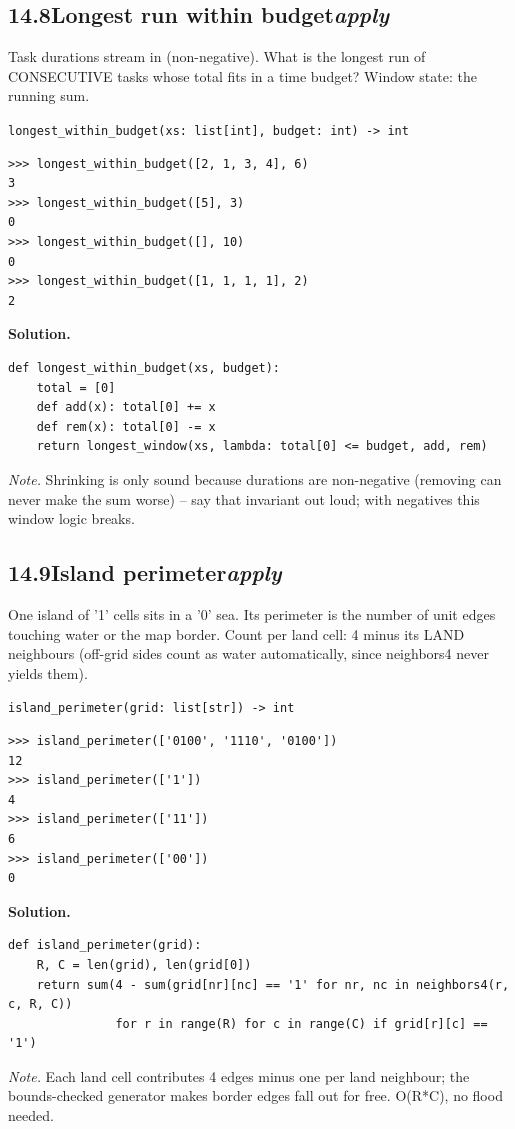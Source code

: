 \documentclass[10pt,letterpaper]{book}
\begin{document}
\subsection*{14.8\quad Longest run within budget\hfill\textnormal{\textit{apply}}}
Task durations stream in (non-negative). What is the longest run of CONSECUTIVE tasks whose total fits in a time budget? Window state: the running sum.

\noindent\texttt{longest\_within\_budget(xs: list[int], budget: int) -> int}
\begin{lstlisting}[style=ex]
>>> longest_within_budget([2, 1, 3, 4], 6)
3
>>> longest_within_budget([5], 3)
0
>>> longest_within_budget([], 10)
0
>>> longest_within_budget([1, 1, 1, 1], 2)
2
\end{lstlisting}
\noindent\textbf{Solution.}
\begin{lstlisting}[style=code]
def longest_within_budget(xs, budget):
    total = [0]
    def add(x): total[0] += x
    def rem(x): total[0] -= x
    return longest_window(xs, lambda: total[0] <= budget, add, rem)
\end{lstlisting}
\noindent\textit{Note.} Shrinking is only sound because durations are non-negative (removing can never make the sum worse) -- say that invariant out loud; with negatives this window logic breaks.

\subsection*{14.9\quad Island perimeter\hfill\textnormal{\textit{apply}}}
One island of '1' cells sits in a '0' sea. Its perimeter is the number of unit edges touching water or the map border. Count per land cell: 4 minus its LAND neighbours (off-grid sides count as water automatically, since neighbors4 never yields them).

\noindent\texttt{island\_perimeter(grid: list[str]) -> int}
\begin{lstlisting}[style=ex]
>>> island_perimeter(['0100', '1110', '0100'])
12
>>> island_perimeter(['1'])
4
>>> island_perimeter(['11'])
6
>>> island_perimeter(['00'])
0
\end{lstlisting}
\noindent\textbf{Solution.}
\begin{lstlisting}[style=code]
def island_perimeter(grid):
    R, C = len(grid), len(grid[0])
    return sum(4 - sum(grid[nr][nc] == '1' for nr, nc in neighbors4(r, c, R, C))
               for r in range(R) for c in range(C) if grid[r][c] == '1')

\end{lstlisting}
\noindent\textit{Note.} Each land cell contributes 4 edges minus one per land neighbour; the bounds-checked generator makes border edges fall out for free. O(R*C), no flood needed.
\end{document}
